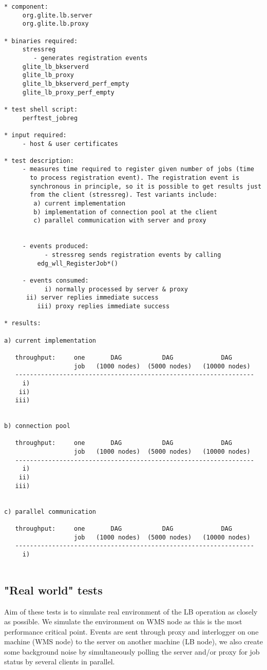 \begin{verbatim}
* component:
     org.glite.lb.server
     org.glite.lb.proxy

* binaries required:
     stressreg
        - generates registration events
     glite_lb_bkserverd
     glite_lb_proxy
     glite_lb_bkserverd_perf_empty
     glite_lb_proxy_perf_empty
     
* test shell script:
     perftest_jobreg

* input required:
     - host & user certificates

* test description:
     - measures time required to register given number of jobs (time
       to process registration event). The registration event is
       synchronous in principle, so it is possible to get results just
       from the client (stressreg). Test variants include:
	    a) current implementation
	    b) implementation of connection pool at the client
	    c) parallel communication with server and proxy
       
       
     - events produced:
           - stressreg sends registration events by calling
	     edg_wll_RegisterJob*()

     - events consumed:
           i) normally processed by server & proxy
	  ii) server replies immediate success
         iii) proxy replies immediate success

* results:

a) current implementation

   throughput:     one       DAG           DAG             DAG
                   job   (1000 nodes)  (5000 nodes)   (10000 nodes)
   -----------------------------------------------------------------
     i)
    ii)
   iii)


b) connection pool

   throughput:     one       DAG           DAG             DAG
                   job   (1000 nodes)  (5000 nodes)   (10000 nodes)
   -----------------------------------------------------------------
     i)
    ii)
   iii)


c) parallel communication

   throughput:     one       DAG           DAG             DAG
                   job   (1000 nodes)  (5000 nodes)   (10000 nodes)
   -----------------------------------------------------------------
     i)


\end{verbatim}

\subsection{"Real world" tests}

Aim of these tests is to simulate real environment of the LB operation as
closely as possible. We simulate the environment on WMS node as this is the
most performance critical point. Events are sent through proxy and interlogger
on one machine (WMS node) to the server on another machine (LB node), we also
create some background noise by simultaneously polling the server and/or proxy
for job status by several clients in parallel.

